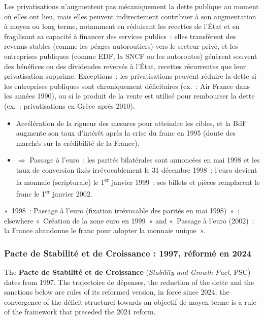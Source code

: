 \begin{remark}
  Les privatisations n'augmentent pas mécaniquement la dette publique au moment où
  elles ont lieu, mais elles peuvent indirectement contribuer à son augmentation à
  moyen ou long terme, notamment en réduisant les recettes de l'État et en fragilisant
  sa capacité à financer des services publics~: elles transfèrent des revenus stables
  (comme les péages autoroutiers) vers le secteur privé, et les entreprises publiques
  (comme EDF, la SNCF ou les autoroutes) génèrent souvent des bénéfices ou des
  dividendes reversés à l'État, recettes récurrentes que leur privatisation supprime.
  Exceptions~: les privatisations peuvent réduire la dette si les entreprises publiques
  sont chroniquement déficitaires (ex.~: Air France dans les années 1990), ou si le
  produit de la vente est utilisé pour rembourser la dette (ex.~: privatisations en
  Grèce après 2010).
\end{remark}

\begin{itemize}
  \item Accélération de la rigueur des mesures pour atteindre les cibles, et la BdF
    augmente son taux d'intérêt après la crise du franc en 1995 (doute des marchés sur
    la crédibilité de la France).
  \item $\Rightarrow$ Passage à l'euro~: les parités bilatérales sont annoncées en mai
    1998 et les taux de conversion fixés irrévocablement le 31 décembre 1998~; l'euro
    devient la monnaie (scripturale) le 1\textsuperscript{er} janvier 1999~; ses
    billets et pièces remplacent le franc le 1\textsuperscript{er} janvier 2002.
\end{itemize}

\begin{remark}
  «~1998~: Passage à l'euro (fixation irrévocable des parités en mai 1998)~»~;
  elsewhere «~Création de la zone euro en 1999~» and «~Passage à l'euro (2002)~: la
  France abandonne le franc pour adopter la monnaie unique~».
\end{remark}

\subsubsection{Pacte de Stabilité et de Croissance : 1997, réformé en 2024}

The \textbf{Pacte de Stabilité et de Croissance} (\textit{Stability and Growth
Pact}, PSC) dates from 1997. The trajectoire de dépenses, the reduction of the dette and the
sanctions below are rules of its reformed version, in force since 2024; the convergence
of the déficit structurel towards an objectif de moyen terme is a rule of the framework
that preceded the 2024 reform.

